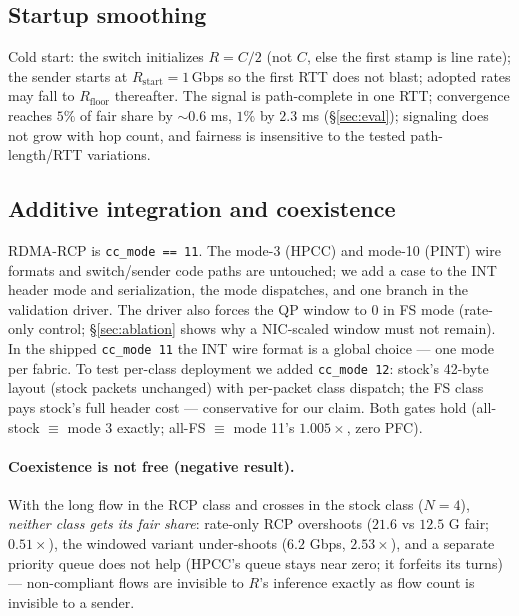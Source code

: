 \documentclass[sigconf, nonacm]{acmart}
\newcommand{\hpccfs}{\textsc{RDMA-RCP}\xspace}
\begin{document}
\subsection{Startup smoothing}
\label{sec:startup}

Cold start: the switch initializes $R = C/2$ (not $C$, else the first stamp is line rate);
the sender starts at $R_{\mathrm{start}} = 1$\,Gbps so the first RTT does not blast; adopted
rates may fall to $R_{\mathrm{floor}}$ thereafter.
The signal is path-complete in one RTT; convergence reaches $5\%$ of fair share by
${\sim}0.6$ ms, $1\%$ by $2.3$ ms (\S\ref{sec:eval}); signaling does not grow with hop
count, and fairness is insensitive to the tested path-length/RTT variations.

\subsection{Additive integration and coexistence}
\label{sec:integration}

\hpccfs is \texttt{cc\_mode == 11}. The mode-3 (HPCC) and mode-10 (PINT) wire formats and
switch/sender code paths are untouched; we add a case to the INT header mode and
serialization, the mode dispatches, and one branch in the validation driver. The driver also forces the
QP window to 0 in FS mode (rate-only control; \S\ref{sec:ablation} shows why a NIC-scaled
window must not remain). In the shipped
\texttt{cc\_mode 11} the INT wire format is a global choice --- one mode per fabric. To test
per-class deployment we added \texttt{cc\_mode 12}: stock's 42-byte layout (stock packets
unchanged) with per-packet class dispatch; the FS class pays stock's full header cost ---
conservative for our claim. Both gates hold
(all-stock $\equiv$ mode 3 exactly; all-FS $\equiv$ mode 11's $1.005\times$, zero PFC).

\paragraph{Coexistence is not free (negative result).}
With the long flow in the RCP class and crosses in the stock class ($N{=}4$),
\emph{neither class gets its fair share}: rate-only RCP overshoots ($21.6$ vs $12.5$ G
fair; $0.51\times$), the windowed variant
under-shoots ($6.2$ Gbps, $2.53\times$), and a separate priority queue does not help (HPCC's queue stays near zero; it forfeits its
turns) --- non-compliant flows are invisible to $R$'s inference exactly as flow count is
invisible to a sender.
\end{document}
